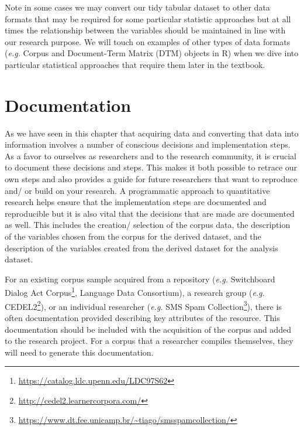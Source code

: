 \documentclass[
  letterpaper,
]{scrbook}
\DeclareRobustCommand{\href}[2]{#2\footnote{\url{#1}}}
\begin{document}
\begin{tcolorbox}[enhanced jigsaw, title=\textcolor{quarto-callout-warning-color}{\faExclamationTriangle}\hspace{0.5em}{Tip}, breakable, colback=white, colframe=quarto-callout-warning-color-frame, bottomrule=.15mm, left=2mm, bottomtitle=1mm, colbacktitle=quarto-callout-warning-color!10!white, opacityback=0, arc=.35mm, toprule=.15mm, coltitle=black, leftrule=.75mm, opacitybacktitle=0.6, toptitle=1mm, titlerule=0mm, rightrule=.15mm]

Note in some cases we may convert our tidy tabular dataset to other data
formats that may be required for some particular statistic approaches
but at all times the relationship between the variables should be
maintained in line with our research purpose. We will touch on examples
of other types of data formats (\emph{e.g.} Corpus and Document-Term
Matrix (DTM) objects in R) when we dive into particular statistical
approaches that require them later in the textbook.

\end{tcolorbox}

\hypertarget{documentation}{%
\section{Documentation}\label{documentation}}

As we have seen in this chapter that acquiring data and converting that
data into information involves a number of conscious decisions and
implementation steps. As a favor to ourselves as researchers and to the
research community, it is crucial to document these decisions and steps.
This makes it both possible to retrace our own steps and also provides a
guide for future researchers that want to reproduce and/ or build on
your research. A programmatic approach to quantitative research helps
ensure that the implementation steps are documented and reproducible but
it is also vital that the decisions that are made are documented as
well. This includes the creation/ selection of the corpus data, the
description of the variables chosen from the corpus for the derived
dataset, and the description of the variables created from the derived
dataset for the analysis dataset.

For an existing corpus sample acquired from a repository (\emph{e.g.}
\href{https://catalog.ldc.upenn.edu/LDC97S62}{Switchboard Dialog Act
Corpus}, Language Data Consortium), a research group (\emph{e.g.}
\href{http://cedel2.learnercorpora.com/}{CEDEL2}), or an individual
researcher (\emph{e.g.}
\href{https://www.dt.fee.unicamp.br/~tiago/smsspamcollection/}{SMS Spam
Collection}), there is often documentation provided describing key
attributes of the resource. This documentation should be included with
the acquisition of the corpus and added to the research project. For a
corpus that a researcher compiles themselves, they will need to generate
this documentation.
\end{document}
